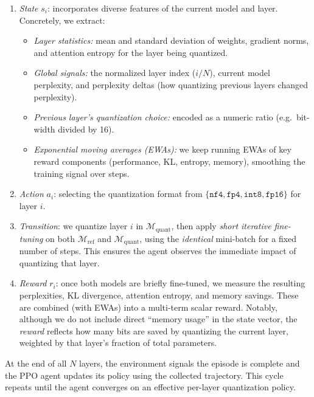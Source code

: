 \documentclass{article}
\begin{document}
	\begin{enumerate}
		\item \textit{State} $s_i$: incorporates diverse features of the current model and layer. Concretely, we extract:
		\begin{itemize}
			\item \emph{Layer statistics:} mean and standard deviation of weights, gradient norms, and attention entropy for the layer being quantized.
			\item \emph{Global signals:} the normalized layer index ($i/N$), current model perplexity, and perplexity deltas (how quantizing previous layers changed perplexity).
			\item \emph{Previous layer’s quantization choice:} encoded as a numeric ratio (e.g.\ bit-width divided by 16).
			\item \emph{Exponential moving averages (EWAs):} we keep running EWAs of key reward components (performance, KL, entropy, memory), smoothing the training signal over steps.
		\end{itemize}
		
		\item \textit{Action} $a_i$: selecting the quantization format from $\{\texttt{nf4}, \texttt{fp4}, \texttt{int8}, \texttt{fp16}\}$ for layer $i$.
		
		\item \textit{Transition}: we quantize layer $i$ in $\mathcal{M}_{\text{quant}}$, then apply \emph{short iterative fine-tuning} on both $\mathcal{M}_{\text{ref}}$ and $\mathcal{M}_{\text{quant}}$, using the \emph{identical} mini-batch for a fixed number of steps. This ensures the agent observes the immediate impact of quantizing that layer.
		
		\item \textit{Reward} $r_i$: once both models are briefly fine-tuned, we measure the resulting perplexities, KL divergence, attention entropy, and memory savings. These are combined (with EWAs) into a multi-term scalar reward. Notably, although we do not include direct “memory usage” in the state vector, the \emph{reward} reflects how many bits are saved by quantizing the current layer, weighted by that layer’s fraction of total parameters.
	\end{enumerate}
	
	At the end of all $N$ layers, the environment signals the episode is complete and the PPO agent updates its policy using the collected trajectory. This cycle repeats until the agent converges on an effective per-layer quantization policy.
	
\end{document}

